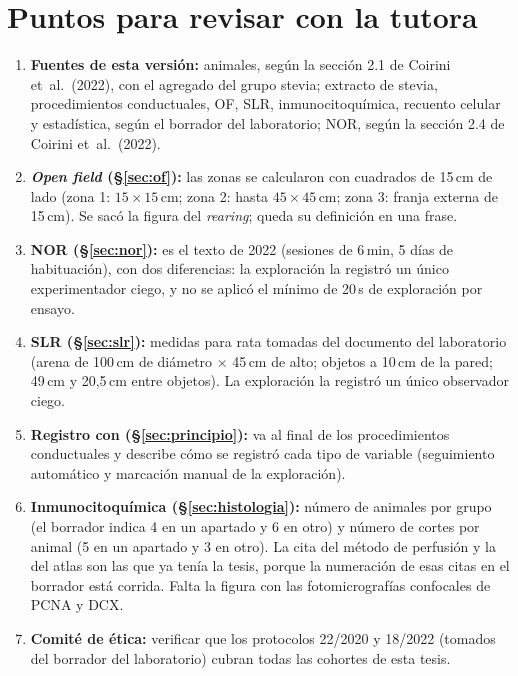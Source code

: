 \documentclass[12pt,a4paper,oneside]{report}
\begin{document}
\chapter*{Puntos para revisar con la tutora}
\begin{enumerate}
  \item \textbf{Fuentes de esta versión:} animales, según la sección 2.1 de Coirini et~al.\ (2022), con el agregado del grupo stevia; extracto de stevia, procedimientos conductuales, OF, SLR, inmunocitoquímica, recuento celular y estadística, según el borrador del laboratorio; NOR, según la sección 2.4 de Coirini et~al.\ (2022).
  \item \textbf{\textit{Open field} (\S\ref{sec:of}):} las zonas se calcularon con cuadrados de 15\,cm de lado (zona 1: $15 \times 15$\,cm; zona 2: hasta $45 \times 45$\,cm; zona 3: franja externa de 15\,cm). Se sacó la figura del \textit{rearing}; queda su definición en una frase.
  \item \textbf{NOR (\S\ref{sec:nor}):} es el texto de 2022 (sesiones de 6\,min, 5 días de habituación), con dos diferencias: la exploración la registró un único experimentador ciego, y no se aplicó el mínimo de 20\,s de exploración por ensayo.
  \item \textbf{SLR (\S\ref{sec:slr}):} medidas para rata tomadas del documento del laboratorio (arena de 100\,cm de diámetro $\times$ 45\,cm de alto; objetos a 10\,cm de la pared; 49\,cm y 20,5\,cm entre objetos). La exploración la registró un único observador ciego.
  \item \textbf{Registro con \anymaze{} (\S\ref{sec:principio}):} va al final de los procedimientos conductuales y describe cómo se registró cada tipo de variable (seguimiento automático y marcación manual de la exploración).
  \item \textbf{Inmunocitoquímica (\S\ref{sec:histologia}):} número de animales por grupo (el borrador indica 4 en un apartado y 6 en otro) y número de cortes por animal (5 en un apartado y 3 en otro). La cita del método de perfusión y la del atlas son las que ya tenía la tesis, porque la numeración de esas citas en el borrador está corrida. Falta la figura con las fotomicrografías confocales de PCNA y DCX.
  \item \textbf{Comité de ética:} verificar que los protocolos 22/2020 y 18/2022 (tomados del borrador del laboratorio) cubran todas las cohortes de esta tesis.
\end{enumerate}
\end{document}
